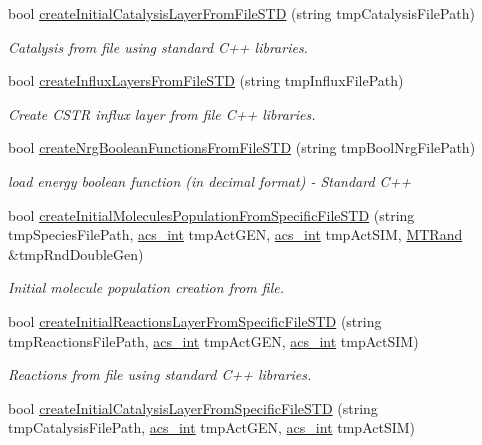 \begin{DoxyCompactItemize}
bool \hyperlink{a00011_a29eeb7a1b4689c10fd872e82179b4d84}{create\-Initial\-Catalysis\-Layer\-From\-File\-S\-T\-D} (string tmp\-Catalysis\-File\-Path)
\begin{DoxyCompactList}\small\item\em Catalysis from file using standard C++ libraries. \end{DoxyCompactList}\item 
bool \hyperlink{a00011_a902df40829dad9a885122082ec8fff7a}{create\-Influx\-Layers\-From\-File\-S\-T\-D} (string tmp\-Influx\-File\-Path)
\begin{DoxyCompactList}\small\item\em Create C\-S\-T\-R influx layer from file C++ libraries. \end{DoxyCompactList}\item 
bool \hyperlink{a00011_abe1a616460ea328067874df715679319}{create\-Nrg\-Boolean\-Functions\-From\-File\-S\-T\-D} (string tmp\-Bool\-Nrg\-File\-Path)
\begin{DoxyCompactList}\small\item\em load energy boolean function (in decimal format) -\/ Standard C++ \end{DoxyCompactList}\item 
bool \hyperlink{a00011_ab85fdf18a88fb51afc48eba31d0ed1b2}{create\-Initial\-Molecules\-Population\-From\-Specific\-File\-S\-T\-D} (string tmp\-Species\-File\-Path, \hyperlink{a00024_a8d277355641a098190360234e2ebde35}{acs\-\_\-int} tmp\-Act\-G\-E\-N, \hyperlink{a00024_a8d277355641a098190360234e2ebde35}{acs\-\_\-int} tmp\-Act\-S\-I\-M, \hyperlink{a00016}{M\-T\-Rand} \&tmp\-Rnd\-Double\-Gen)
\begin{DoxyCompactList}\small\item\em Initial molecule population creation from file. \end{DoxyCompactList}\item 
bool \hyperlink{a00011_a743956229b11d7860dbc89a18f869586}{create\-Initial\-Reactions\-Layer\-From\-Specific\-File\-S\-T\-D} (string tmp\-Reactions\-File\-Path, \hyperlink{a00024_a8d277355641a098190360234e2ebde35}{acs\-\_\-int} tmp\-Act\-G\-E\-N, \hyperlink{a00024_a8d277355641a098190360234e2ebde35}{acs\-\_\-int} tmp\-Act\-S\-I\-M)
\begin{DoxyCompactList}\small\item\em Reactions from file using standard C++ libraries. \end{DoxyCompactList}\item 
bool \hyperlink{a00011_a6dd31bae82367ebe7d6a6bb062b8cd07}{create\-Initial\-Catalysis\-Layer\-From\-Specific\-File\-S\-T\-D} (string tmp\-Catalysis\-File\-Path, \hyperlink{a00024_a8d277355641a098190360234e2ebde35}{acs\-\_\-int} tmp\-Act\-G\-E\-N, \hyperlink{a00024_a8d277355641a098190360234e2ebde35}{acs\-\_\-int} tmp\-Act\-S\-I\-M)

\end{DoxyCompactItemize}
